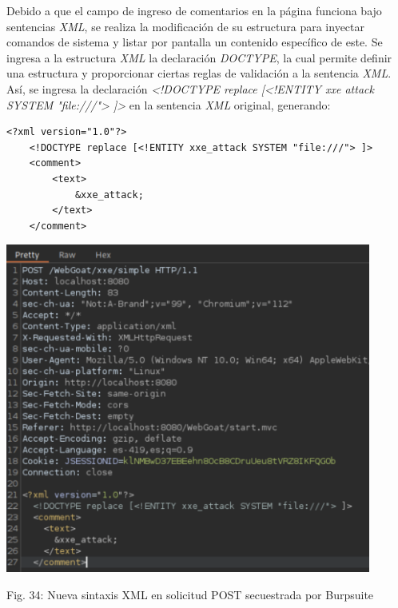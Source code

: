 \documentclass[12pt,oneside,a4paper]{book}
\begin{document}
\begin{enumerate}
\begin{enumerate}
        \hspace{20pt}
        Debido a que el campo de ingreso de comentarios en la página funciona bajo sentencias \textit{XML}, se realiza la modificación de su estructura para inyectar comandos de sistema y listar por pantalla un contenido específico de este. Se ingresa a la estructura \textit{XML} la declaración \textit{DOCTYPE}, la cual permite definir una estructura y proporcionar ciertas reglas de validación a la sentencia \textit{XML}. Así, se ingresa la declaración \textit{<!DOCTYPE replace [<!ENTITY xxe attack SYSTEM "file:///"> ]>} en la sentencia \textit{XML} original, generando:

        \newpage

        \begin{verbatim}
<?xml version="1.0"?>
    <!DOCTYPE replace [<!ENTITY xxe_attack SYSTEM "file:///"> ]>
    <comment>
        <text>
            &xxe_attack;
        </text>
    </comment>
        \end{verbatim}

        \vspace{2em}

        \begin{center}
            \includegraphics[width=12cm]{img/xxe2.png}
            
            \vspace{0.1em}
            
            Fig. 34: Nueva sintaxis XML en solicitud POST secuestrada por Burpsuite
        \end{center}
        

\end{enumerate}
\end{enumerate}
\end{document}
